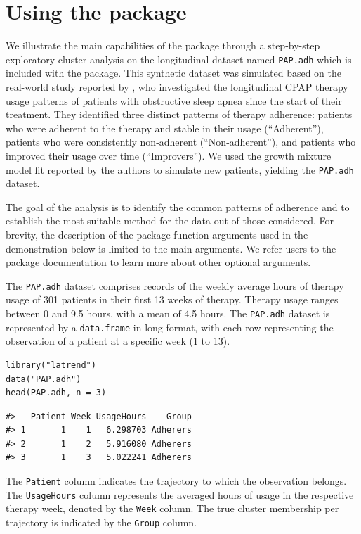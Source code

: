 \section{Using the package}\label{sec:demo}

We illustrate the main capabilities of the package through a step-by-step exploratory cluster analysis on the longitudinal dataset named \texttt{PAP.adh} which is included with the package. This synthetic dataset was simulated based on the real-world study reported by \citet{yi2022identifying}, who investigated the longitudinal CPAP therapy usage patterns of patients with obstructive sleep apnea since the start of their treatment. They identified three distinct patterns of therapy adherence: patients who were adherent to the therapy and stable in their usage (``Adherent''), patients who were consistently non-adherent (``Non-adherent''), and patients who improved their usage over time (``Improvers''). We used the growth mixture model fit reported by the authors to simulate new patients, yielding the \texttt{PAP.adh} dataset.

The goal of the analysis is to identify the common patterns of adherence and to establish the most suitable method for the data out of those considered. For brevity, the description of the package function arguments used in the demonstration below is limited to the main arguments. We refer users to the package documentation to learn more about other optional arguments.

The \texttt{PAP.adh} dataset comprises records of the weekly average hours of therapy usage of 301 patients in their first 13 weeks of therapy. Therapy usage ranges between 0 and 9.5 hours, with a mean of 4.5 hours. The \texttt{PAP.adh} dataset is represented by a \texttt{data.frame} in long format, with each row representing the observation of a patient at a specific week (1 to 13).

\begin{verbatim}
library("latrend")
data("PAP.adh")
head(PAP.adh, n = 3)
\end{verbatim}

\begin{verbatim}
#>   Patient Week UsageHours    Group
#> 1       1    1   6.298703 Adherers
#> 2       1    2   5.916080 Adherers
#> 3       1    3   5.022241 Adherers
\end{verbatim}

The \texttt{Patient} column indicates the trajectory to which the observation belongs. The \texttt{UsageHours} column represents the averaged hours of usage in the respective therapy week, denoted by the \texttt{Week} column. The true cluster membership per trajectory is indicated by the \texttt{Group} column.

